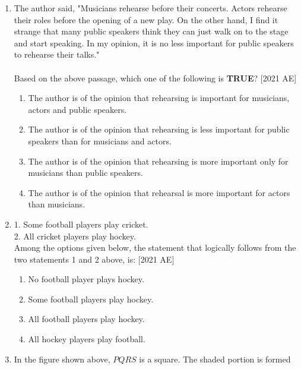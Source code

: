 \documentclass[journal]{IEEEtran}
\begin{document}
\begin{enumerate}
\hfill [2021 AE]
\begin{enumerate}
\end{enumerate}
\item The author said, "Musicians rehearse before their concerts. Actors rehearse
their roles before the opening of a new play. On the other hand, I find it
strange that many public speakers think they can just walk on to the stage
and start speaking. In my opinion, it is no less important for public speakers
to rehearse their talks." \\ \\ Based on the above passage, which one of the following is \textbf{TRUE}? \hfill[2021 AE]
\begin{enumerate}
    \item The author is of the opinion that rehearsing is important for musicians, actors
and public speakers.
\item The author is of the opinion that rehearsing is less important for public speakers
than for musicians and actors.
\item The author is of the opinion that rehearsing is more important only for
musicians than public speakers.
\item The author is of the opinion that rehearsal is more important for actors than
musicians.
\end{enumerate}
\item 1. Some football players play cricket.\\
2. All cricket players play hockey. \\ 
Among the options given below, the statement that logically follows from the two statements 1 and 2 above, is: \hfill [2021 AE]
\begin{enumerate}
    \item No football player plays hockey.
    \item Some football players play hockey.
    \item All football players play hockey.
    \item All hockey players play football.
\end{enumerate}
\item 
In the figure shown above, $PQRS$ is a square. The shaded portion is formed

\end{enumerate}
\end{document}

